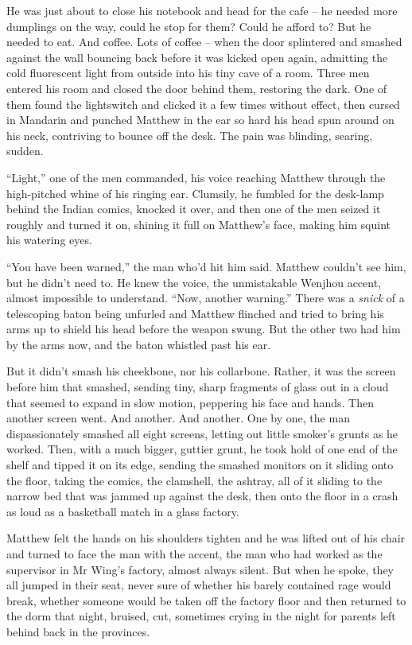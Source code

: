 He was just about to close his notebook and head for the cafe -- he
needed more dumplings on the way, could he stop for them? Could he
afford to? But he needed to eat. And coffee. Lots of coffee -- when
the door splintered and smashed against the wall bouncing back
before it was kicked open again, admitting the cold fluorescent
light from outside into his tiny cave of a room. Three men entered
his room and closed the door behind them, restoring the dark. One
of them found the lightswitch and clicked it a few times without
effect, then cursed in Mandarin and punched Matthew in the ear so
hard his head spun around on his neck, contriving to bounce off the
desk. The pain was blinding, searing, sudden.

``Light,'' one of the men commanded, his voice reaching Matthew
through the high-pitched whine of his ringing ear. Clumsily, he
fumbled for the desk-lamp behind the Indian comics, knocked it
over, and then one of the men seized it roughly and turned it on,
shining it full on Matthew's face, making him squint his watering
eyes.

``You have been warned,'' the man who'd hit him said. Matthew
couldn't see him, but he didn't need to. He knew the voice, the
unmistakable Wenjhou accent, almost impossible to understand. ``Now,
another warning.'' There was a \emph{snick} of a telescoping baton
being unfurled and Matthew flinched and tried to bring his arms up
to shield his head before the weapon swung. But the other two had
him by the arms now, and the baton whistled past his ear.

But it didn't smash his cheekbone, nor his collarbone. Rather, it
was the screen before him that smashed, sending tiny, sharp
fragments of glass out in a cloud that seemed to expand in slow
motion, peppering his face and hands. Then another screen went. And
another. And another. One by one, the man dispassionately smashed
all eight screens, letting out little smoker's grunts as he worked.
Then, with a much bigger, guttier grunt, he took hold of one end of
the shelf and tipped it on its edge, sending the smashed monitors
on it sliding onto the floor, taking the comics, the clamshell, the
ashtray, all of it sliding to the narrow bed that was jammed up
against the desk, then onto the floor in a crash as loud as a
basketball match in a glass factory.

Matthew felt the hands on his shoulders tighten and he was lifted
out of his chair and turned to face the man with the accent, the
man who had worked as the supervisor in Mr Wing's factory, almost
always silent. But when he spoke, they all jumped in their seat,
never sure of whether his barely contained rage would break,
whether someone would be taken off the factory floor and then
returned to the dorm that night, bruised, cut, sometimes crying in
the night for parents left behind back in the provinces.

